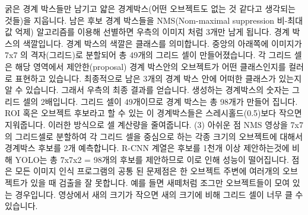 \documentclass{article}
\begin{document}
굵은 경계 박스들만 남기고 얇은 경계박스(어떤 오브젝트도 없는 것 같다고 생각되는 것들)을 지웁니다.
남은 후보 경계 박스들을 NMS(Nom-maximal suppression 비-최대값 억제) 알고리즘를 이용해 선별하면 우측의 이미지 처럼 3개만 남게 됩니다.
 경계 박스의 색깔입니다. 
경계 박스의 색깔은 클래스를 의미합니다. 
중앙의 아래쪽에 이미지가 7x7 의 격자(그리드)로 분할되어 총 49개의 그리드 셀이 만들어졌습니다.
각 그리드 셀은 해당 영역에서 제안한(proposal) 경계 박스안의 오브젝트가 어떤 클래스인지를 컬러로 표현하고 있습니다.
 최종적으로 남은 3개의 경계 박스 안에 어떠한 클래스가 있는지 알 수 있습니다.
그래서 우측의 최종 결과를 얻습니다.
 생성하는 경계박스의 숫자는 그리드 셀의 2배입니다. 
그리드 셀이 49개이므로 경계 박스는 총 98개가 만들어 집니다.
ROI 혹은 오브젝트 후보라고 할 수 있는 이 경계박스들은 스레시홀드(0.5)보다 작으면 지워줍니다.
이러한 방식으로 셀 계산량을 줄여줍니다.
\newline
\newline(3) 아쉬운 점
\newline
\newline NMS 영상을 7x7 의 그리드셀로 분할하여 각 그리드 셀을 중심으로 하는 각종 크기의 오브젝트에 대해서 경계박스 후보를 2개 예측합니다.
R-CNN 계열은 후보를 1천개 이상 제안하는것에 비해 YOLO는 총 7x7x2 = 98개의 후보를 제안하므로 이로 인해 성능이 떨어집니다. 
 점은 모든 이미지 인식 프로그램의 공통 된 문제점은 
한 오브젝트 주변에 여러개의 오브젝트가 있을 때 검출을 잘 못합니다.
예를 들면 새떼처럼 조그만 오브젝트들이 모여 있는 경우입니다.
영상에서 새의 크기가 작으면 새의 크기에 비해 그리드 셀이 너무 클 수 있습니다.




\end{document}
